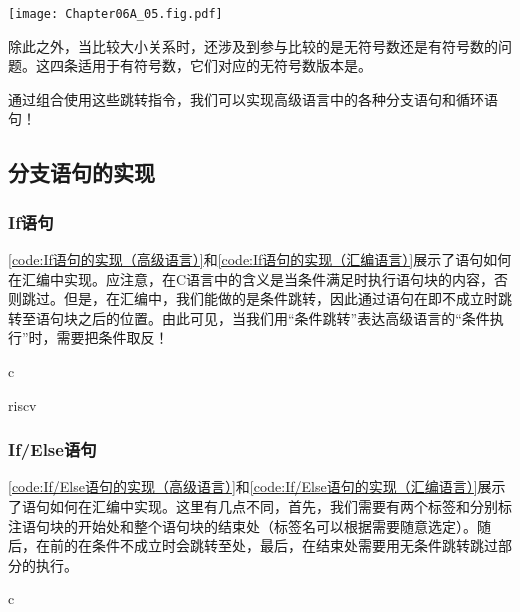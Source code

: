 \begin{Figure}
    \texttt{[image: Chapter06A\_05.fig.pdf]}
\end{Figure}

除此之外，当比较大小关系时，还涉及到参与比较的是无符号数还是有符号数的问题。这四条适用于有符号数，它们对应的无符号数版本是。

通过组合使用这些跳转指令，我们可以实现高级语言中的各种分支语句和循环语句！

\subsection{分支语句的实现}

\subsubsection{If语句}
\cref{code:If语句的实现（高级语言）}和\cref{code:If语句的实现（汇编语言）}展示了语句如何在汇编中实现。应注意，在C语言中的含义是当条件满足时执行语句块的内容，否则跳过。但是，在汇编中，我们能做的是条件跳转，因此通过语句在即不成立时跳转至语句块之后的位置。由此可见，当我们用“条件跳转”表达高级语言的“条件执行”时，需要把条件取反！

\begin{Code}{c}
    
\end{Code}

\begin{Code}{riscv}
    
\end{Code}

\subsubsection{If/Else语句}
\cref{code:If/Else语句的实现（高级语言）}和\cref{code:If/Else语句的实现（汇编语言）}展示了语句如何在汇编中实现。这里有几点不同，首先，我们需要有两个标签和分别标注语句块的开始处和整个语句块的结束处（标签名可以根据需要随意选定）。随后，在前的在条件不成立时会跳转至处，最后，在结束处需要用无条件跳转跳过部分的执行。

\begin{Code}{c}
    
\end{Code}

